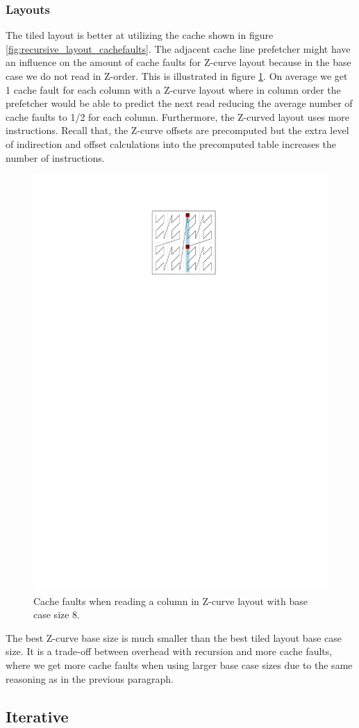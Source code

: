 \subsubsection{Layouts}

The tiled layout is better at utilizing the cache shown in figure \ref{fig:recursive_layout_cachefaults}. The adjacent cache line prefetcher might have an influence on the amount of cache faults for Z-curve layout because in the base case we do not read in Z-order. This is illustrated in figure \ref{fig:z-order}. On average we get 1 cache fault for each column with a Z-curve layout where in column order the prefetcher would be able to predict the next read reducing the average number of cache faults to 1/2 for each column. Furthermore, the Z-curved layout uses more instructions. Recall that, the Z-curve offsets are precomputed but the extra level of indirection and offset calculations into the precomputed table increases the number of instructions.

\begin{figure}[h!]
  \centering
  \includegraphics[width=.3\textwidth]{images/zlayout_cachefaults}
  \caption{Cache faults when reading a column in Z-curve layout with base case size 8.}
  \label{fig:z-order}
\end{figure}

The best Z-curve base size is much smaller than the best tiled layout base case size. It is a trade-off between overhead with recursion and more cache faults, where we get more cache faults when using larger base case sizes due to the same reasoning as in the previous paragraph.

\subsection{Iterative}

